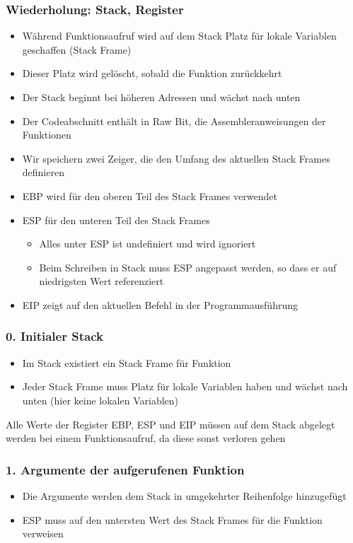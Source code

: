\subsubsection*{Wiederholung: Stack, Register}
\begin{itemize}
    \item Während Funktionsaufruf wird auf dem Stack Platz für lokale Variablen geschaffen (Stack Frame)
    \item Dieser Platz wird gelöscht, sobald die Funktion zurückkehrt
    \item Der Stack beginnt bei höheren Adressen und wächst nach unten
    \item Der Codeabschnitt enthält in Raw Bit, die Assembleranweisungen der Funktionen
    \item Wir speichern zwei Zeiger, die den Umfang des aktuellen Stack Frames definieren
    \item EBP wird für den oberen Teil des Stack Frames verwendet
    \item ESP für den unteren Teil des Stack Frames 
    \begin{itemize}
        \item Alles unter ESP ist undefiniert und wird ignoriert
        \item Beim Schreiben in Stack muss ESP angepasst werden, so dass er auf niedrigsten Wert referenziert
    \end{itemize}
    \item EIP zeigt auf den aktuellen Befehl in der Programmausführung
\end{itemize}
\subsubsection*{0. Initialer Stack}
\begin{itemize}
    \item Im Stack existiert ein Stack Frame für Funktion 
    \item Jeder Stack Frame muss Platz für lokale Variablen haben und wächst nach unten (hier keine lokalen Variablen)
\end{itemize}
 Alle Werte der Register EBP, ESP und EIP müssen auf dem Stack abgelegt werden bei einem Funktionsaufruf, da diese sonst verloren gehen
\subsubsection*{1. Argumente der aufgerufenen Funktion}
\begin{itemize}
    \item Die Argumente werden dem Stack in umgekehrter Reihenfolge hinzugefügt
    \item ESP muss auf den untersten Wert des Stack Frames für die Funktion  verweisen
\end{itemize}
